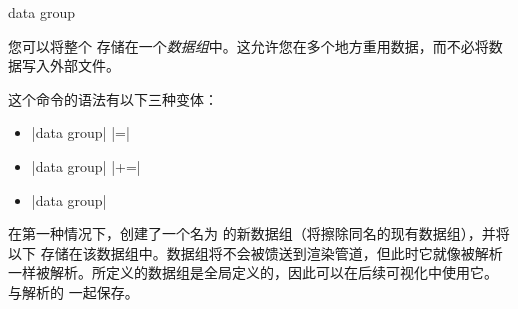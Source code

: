 \begin{datavisualizationoperation}{data group}{} %

    您可以将整个  存储在一个\emph{数据组}中。这允许您在多个地方重用数据，而不必将数据写入外部文件。


    这个命令的语法有以下三种变体：
    \begin{itemize}
        \item |data group|   |=| 
        \item |data group|   |+=| 
        \item |data group|  
    \end{itemize}
    在第一种情况下，创建了一个名为  的新数据组（将擦除同名的现有数据组），并将以下  存储在该数据组中。数据组将不会被馈送到渲染管道，但此时它就像被解析一样被解析。所定义的数据组是全局定义的，因此可以在后续可视化中使用它。 与解析的  一起保存。



\end{datavisualizationoperation}
